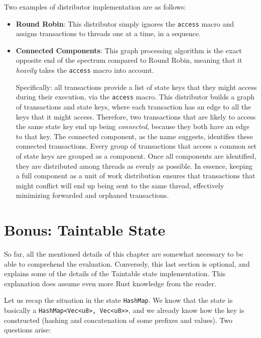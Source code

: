 Two examples of distributor implementation are as follows:

\begin{itemize}
	\item \textbf{Round Robin}: This distributor simply ignores the \texttt{access} macro and
	assigns transactions to threads one at a time, in a sequence.
	\item \textbf{Connected Components}\cite{nuutilaFindingStronglyConnected1994}: This graph
	processing algorithm is the exact opposite end of the spectrum compared to Round Robin, meaning
	that it \textit{heavily} takes the \texttt{access} macro into account.

	Specifically: all transactions provide a list of state keys
	that they might access during their execution, via the \texttt{access} macro. This distributor
	builds a graph of transactions and state keys, where each transaction has an edge to all the keys
	that it might access. Therefore, two transactions that are likely to access the same state key
	end up being \textit{connected}, because they both have an edge to that key. The connected
	component, as the name suggests, identifies these connected transactions. Every group of
	transactions that access a common set of state keys are grouped as a component. Once all
	components are identified, they are distributed among threads as evenly as possible. In essence,
	keeping a full component as a unit of work distribution ensures that transactions that might conflict will end up being sent to
	the same thread, effectively minimizing forwarded and orphaned transactions.
\end{itemize}

\section{Bonus: Taintable State} \label{chap_impl:sec:bonus}

So far, all the mentioned details of this chapter are somewhat necessary to be
able to comprehend the evaluation. Conversely, this last section is optional, and explains some of the
details of the Taintable state implementation. This explanation does assume even more Rust
knowledge from the reader.

Let us recap the situation in the state \texttt{HashMap}. We know that the state is basically a
\texttt{HashMap<Vec<u8>, Vec<u8>>}, and we already know how the key is constructed (hashing and
concatenation of some prefixes and values). Two questions arise:

